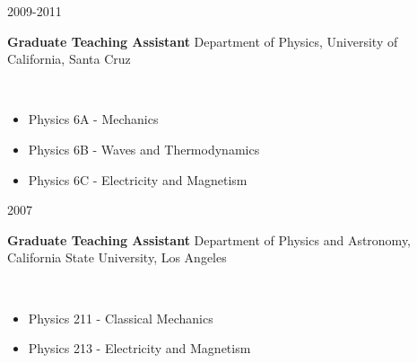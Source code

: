 \documentclass[11pt]{article}
\newcommand{\teachingentry}[4] { 
    \noindent
    \begin{minipage}[t]{0.15\textwidth} \begin{flushright} #1 \end{flushright} \end{minipage} \hspace{0.01\textwidth}
    \begin{minipage}[t]{0.84\textwidth}
        \textbf{#2} \newline
        #3  
    \end{minipage} \\[0.01pt]
    #4 \vspace{11pt}
}
\begin{document}
        \teachingentry{2009-2011}{Graduate Teaching Assistant}
                      {Department of Physics, University of California, Santa Cruz}
                      {
                        \begin{itemize}[label=\textcolor{indigodye}{$\circ$}, noitemsep, nolistsep, leftmargin=0.19\textwidth]
                            \item Physics 6A - Mechanics                                 
                            \item Physics 6B - Waves and Thermodynamics                  
                            \item Physics 6C - Electricity and Magnetism                
                          \end{itemize}
                      }

        \teachingentry{2007}{Graduate Teaching Assistant}
                      {Department of Physics and Astronomy, California State University, Los Angeles}
                      {  
                        \begin{itemize}[label=\textcolor{indigodye}{$\circ$}, noitemsep, nolistsep, leftmargin=0.19\textwidth]
                            \item Physics 211 - Classical Mechanics                      
                            \item Physics 213 - Electricity and Magnetism 
                        \end{itemize}
                      }
   
\end{document}
